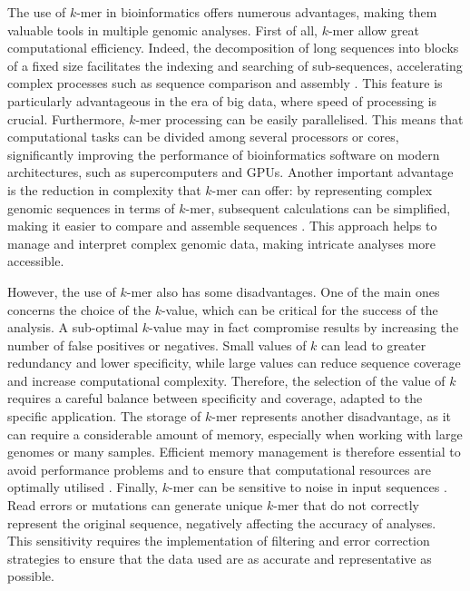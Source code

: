 	The use of $k$-mer in bioinformatics offers numerous advantages, making them valuable tools in multiple genomic analyses. First of all, $k$-mer allow great computational efficiency. Indeed, the decomposition of long sequences into blocks of a fixed size facilitates the indexing and searching of sub-sequences, accelerating complex processes such as sequence comparison and assembly \cite{compeau2011how,li2009fast}. This feature is particularly advantageous in the era of big data, where speed of processing is crucial. Furthermore, $k$-mer processing can be easily parallelised. This means that computational tasks can be divided among several processors or cores, significantly improving the performance of bioinformatics software on modern architectures, such as supercomputers and GPUs. Another important advantage is the reduction in complexity that $k$-mer can offer: by representing complex genomic sequences in terms of $k$-mer, subsequent calculations can be simplified, making it easier to compare and assemble sequences \cite{chikhi2014informed}. This approach helps to manage and interpret complex genomic data, making intricate analyses more accessible.
	
	However, the use of $k$-mer also has some disadvantages. One of the main ones concerns the choice of the $k$-value, which can be critical for the success of the analysis. A sub-optimal $k$-value may in fact compromise results by increasing the number of false positives or negatives. Small values of $k$ can lead to greater redundancy and lower specificity, while large values can reduce sequence coverage and increase computational complexity. Therefore, the selection of the value of $k$ requires a careful balance between specificity and coverage, adapted to the specific application. The storage of $k$-mer represents another disadvantage, as it can require a considerable amount of memory, especially when working with large genomes or many samples. Efficient memory management is therefore essential to avoid performance problems and to ensure that computational resources are optimally utilised \cite{marcais2011jellyfish,li2017efficient}. Finally, $k$-mer can be sensitive to noise in input sequences \cite{ilie2013racer}. Read errors or mutations can generate unique $k$-mer that do not correctly represent the original sequence, negatively affecting the accuracy of analyses. This sensitivity requires the implementation of filtering and error correction strategies to ensure that the data used are as accurate and representative as possible.
